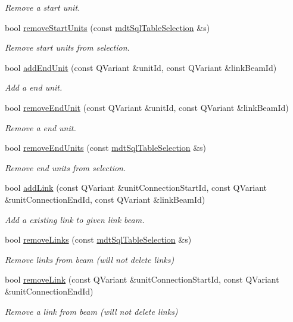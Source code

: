 \begin{DoxyCompactItemize}
\begin{DoxyCompactList}\small\item\em Remove a start unit. \end{DoxyCompactList}\item 
bool \hyperlink{classmdt_cl_link_beam_a70c87c656d40d234de2642ca8e4c01f0}{remove\-Start\-Units} (const \hyperlink{classmdt_sql_table_selection}{mdt\-Sql\-Table\-Selection} \&s)
\begin{DoxyCompactList}\small\item\em Remove start units from selection. \end{DoxyCompactList}\item 
bool \hyperlink{classmdt_cl_link_beam_ab649469805b4b3927d9fb24358d586bb}{add\-End\-Unit} (const Q\-Variant \&unit\-Id, const Q\-Variant \&link\-Beam\-Id)
\begin{DoxyCompactList}\small\item\em Add a end unit. \end{DoxyCompactList}\item 
bool \hyperlink{classmdt_cl_link_beam_a6c5044dc82935012ba6ce94aa051de63}{remove\-End\-Unit} (const Q\-Variant \&unit\-Id, const Q\-Variant \&link\-Beam\-Id)
\begin{DoxyCompactList}\small\item\em Remove a end unit. \end{DoxyCompactList}\item 
bool \hyperlink{classmdt_cl_link_beam_a232c48e68d95da3ebabbac57a1a5b6eb}{remove\-End\-Units} (const \hyperlink{classmdt_sql_table_selection}{mdt\-Sql\-Table\-Selection} \&s)
\begin{DoxyCompactList}\small\item\em Remove end units from selection. \end{DoxyCompactList}\item 
bool \hyperlink{classmdt_cl_link_beam_ae330086070f68a41ffe6a0e21c020e2d}{add\-Link} (const Q\-Variant \&unit\-Connection\-Start\-Id, const Q\-Variant \&unit\-Connection\-End\-Id, const Q\-Variant \&link\-Beam\-Id)
\begin{DoxyCompactList}\small\item\em Add a existing link to given link beam. \end{DoxyCompactList}\item 
bool \hyperlink{classmdt_cl_link_beam_a8961201116d6c739c0016e3dd1439f9b}{remove\-Links} (const \hyperlink{classmdt_sql_table_selection}{mdt\-Sql\-Table\-Selection} \&s)
\begin{DoxyCompactList}\small\item\em Remove links from beam (will not delete links) \end{DoxyCompactList}\item 
bool \hyperlink{classmdt_cl_link_beam_a92491b64f186b9383472bc1262a27120}{remove\-Link} (const Q\-Variant \&unit\-Connection\-Start\-Id, const Q\-Variant \&unit\-Connection\-End\-Id)
\begin{DoxyCompactList}\small\item\em Remove a link from beam (will not delete links) \end{DoxyCompactList}\end{DoxyCompactItemize}
